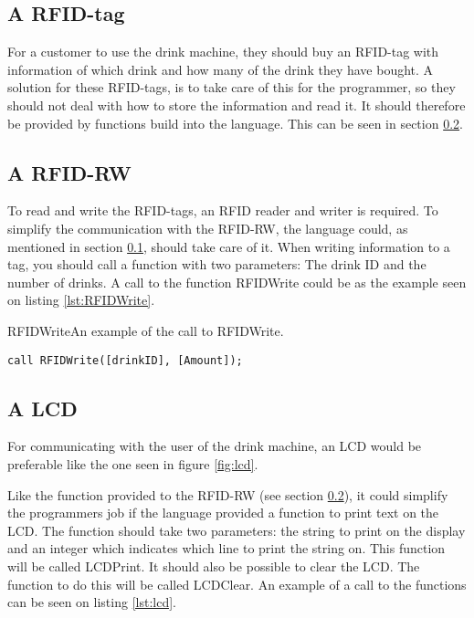 \subsection{A RFID-tag}
\label{sec:RFIDtag}
For a customer to use the drink machine, they should buy an RFID-tag with information of which drink and how many of the drink they have bought. A solution for these RFID-tags, is to take care of this for the programmer, so they should not deal with how to store the information and read it. It should therefore be provided by functions build into the language. This can be seen in section \ref{sec:RFIDRW}.

\subsection{A RFID-RW}
\label{sec:RFIDRW}
To read and write the RFID-tags, an RFID reader and writer is required. To simplify the communication with the RFID-RW, the language could, as mentioned in section \ref{sec:RFIDtag}, should take care of it. When writing information to a tag, you should call a function with two parameters: The drink ID and the number of drinks. A call to the function RFIDWrite could be as the example seen on listing \ref{lst:RFIDWrite}.

\begin{code}{RFIDWrite}{An example of the call to RFIDWrite.}
\begin{lstlisting}[mathescape]
call RFIDWrite([drinkID], [Amount]);
\end{lstlisting}
\end{code}

\subsection{A LCD}
For communicating with the user of the drink machine, an LCD would be preferable like the one seen in figure \ref{fig:lcd}.


Like the function provided to the RFID-RW (see section \ref{sec:RFIDRW}), it could simplify the programmers job if the language provided a function to print text on the LCD. The function should take two parameters: the string to print on the display and an integer which indicates which line to print the string on. This function will be called LCDPrint. It should also be possible to clear the LCD. The function to do this will be called LCDClear. An example of a call to the functions can be seen on listing \ref{lst:lcd}.

